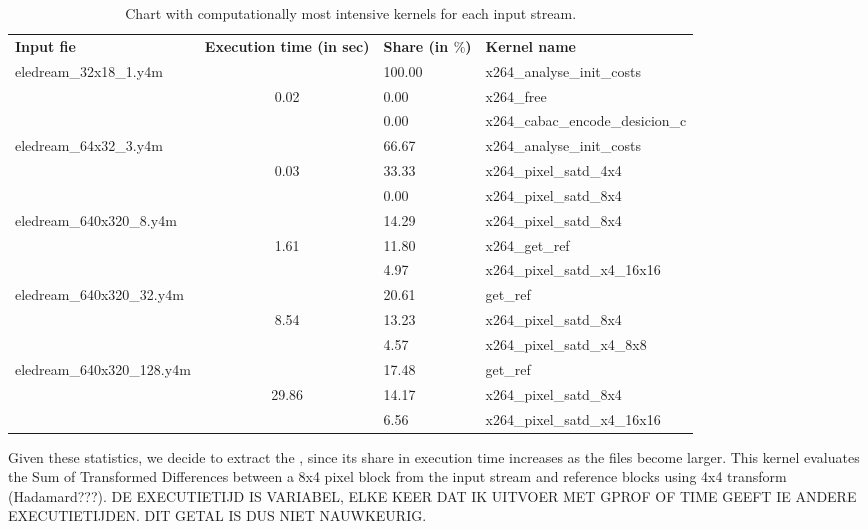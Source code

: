 \begin{table}[htb]%
\centering
	\begin{tabular}{lcll}
		\centering
		\bf{Input fie} & \bf{Execution time (in sec)} & \bf{Share (in $\%$)} & \bf{Kernel name} \\ \cline{1-4}
		\multirow{3}{*}{eledream\_32x18\_1.y4m}	&				& 100.00	& x264\_analyse\_init\_costs\\ 
																						&	0.02	& 0.00 		& x264\_free\\ 
																						&				& 0.00		& x264\_cabac\_encode\_desicion\_c\\ \cline{1-4}
		\multirow{3}{*}{eledream\_64x32\_3.y4m} & 			& 66.67		& x264\_analyse\_init\_costs\\
																						&	0.03	& 33.33 	& x264\_pixel\_satd\_4x4\\ 
																						&				& 0.00		& x264\_pixel\_satd\_8x4\\ \cline{1-4}
		\multirow{3}{*}{eledream\_640x320\_8.y4m}	& 			& 14.29	& x264\_pixel\_satd\_8x4\\ 
																							&	1.61	& 11.80 	& x264\_get\_ref\\ 
																							&				& 4.97		& x264\_pixel\_satd\_x4\_16x16\\ \cline{1-4}
		\multirow{3}{*}{eledream\_640x320\_32.y4m}& 			& 20.61	& get\_ref\\ 
																							& 8.54	& 13.23 	& x264\_pixel\_satd\_8x4\\ 
																							&				& 4.57		& x264\_pixel\_satd\_x4\_8x8\\ \cline{1-4}
		\multirow{3}{*}{eledream\_640x320\_128.y4m}&			& 17.48	& get\_ref\\
																							&	 29.86& 14.17 	& x264\_pixel\_satd\_8x4\\
																							&				& 6.56		& x264\_pixel\_satd\_x4\_16x16\\ \cline{1-4}
	\end{tabular}	

\caption{Chart with computationally most intensive kernels for each input stream.}
\label{tab:chart}
\end{table}

Given these statistics, we decide to extract the , since its share in execution time increases as the files become larger. This kernel evaluates the Sum of Transformed Differences between a 8x4 pixel block from the input stream and reference blocks using 4x4 transform (Hadamard???). DE EXECUTIETIJD IS VARIABEL, ELKE KEER DAT IK UITVOER MET GPROF OF TIME GEEFT IE ANDERE EXECUTIETIJDEN. DIT GETAL IS DUS NIET NAUWKEURIG.

